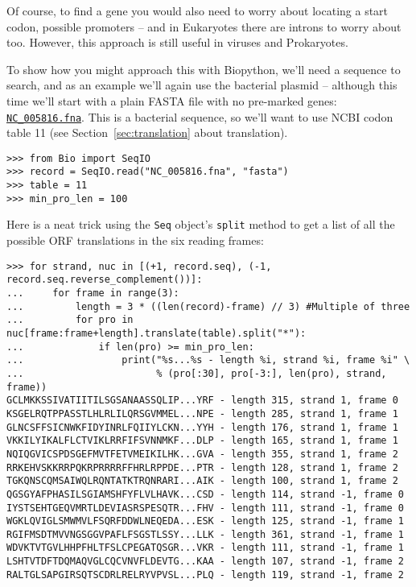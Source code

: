 \documentclass{report}
\begin{document}
Of course, to find a gene you would also need to worry about locating a start
codon, possible promoters -- and in Eukaryotes there are introns to worry about
too.  However, this approach is still useful in viruses and Prokaryotes.

To show how you might approach this with Biopython, we'll need a sequence to
search, and as an example we'll again use the bacterial plasmid -- although
this time we'll start with a plain FASTA file with no pre-marked genes:
\href{http://biopython.org/SRC/biopython/Tests/GenBank/NC_005816.fna}
{\texttt{NC\_005816.fna}}. This is a bacterial sequence, so we'll want to use
NCBI codon table 11 (see Section~\ref{sec:translation} about translation).

\begin{verbatim}
>>> from Bio import SeqIO 
>>> record = SeqIO.read("NC_005816.fna", "fasta")
>>> table = 11
>>> min_pro_len = 100
\end{verbatim}

Here is a neat trick using the \verb|Seq| object's \verb|split| method to
get a list of all the possible ORF translations in the six reading frames:

\begin{verbatim}
>>> for strand, nuc in [(+1, record.seq), (-1, record.seq.reverse_complement())]:
...     for frame in range(3):
...         length = 3 * ((len(record)-frame) // 3) #Multiple of three
...         for pro in nuc[frame:frame+length].translate(table).split("*"):
...             if len(pro) >= min_pro_len:
...                 print("%s...%s - length %i, strand %i, frame %i" \
...                       % (pro[:30], pro[-3:], len(pro), strand, frame))
GCLMKKSSIVATIITILSGSANAASSQLIP...YRF - length 315, strand 1, frame 0
KSGELRQTPPASSTLHLRLILQRSGVMMEL...NPE - length 285, strand 1, frame 1
GLNCSFFSICNWKFIDYINRLFQIIYLCKN...YYH - length 176, strand 1, frame 1
VKKILYIKALFLCTVIKLRRFIFSVNNMKF...DLP - length 165, strand 1, frame 1
NQIQGVICSPDSGEFMVTFETVMEIKILHK...GVA - length 355, strand 1, frame 2
RRKEHVSKKRRPQKRPRRRRFFHRLRPPDE...PTR - length 128, strand 1, frame 2
TGKQNSCQMSAIWQLRQNTATKTRQNRARI...AIK - length 100, strand 1, frame 2
QGSGYAFPHASILSGIAMSHFYFLVLHAVK...CSD - length 114, strand -1, frame 0
IYSTSEHTGEQVMRTLDEVIASRSPESQTR...FHV - length 111, strand -1, frame 0
WGKLQVIGLSMWMVLFSQRFDDWLNEQEDA...ESK - length 125, strand -1, frame 1
RGIFMSDTMVVNGSGGVPAFLFSGSTLSSY...LLK - length 361, strand -1, frame 1
WDVKTVTGVLHHPFHLTFSLCPEGATQSGR...VKR - length 111, strand -1, frame 1
LSHTVTDFTDQMAQVGLCQCVNVFLDEVTG...KAA - length 107, strand -1, frame 2
RALTGLSAPGIRSQTSCDRLRELRYVPVSL...PLQ - length 119, strand -1, frame 2
\end{verbatim}
\end{document}
